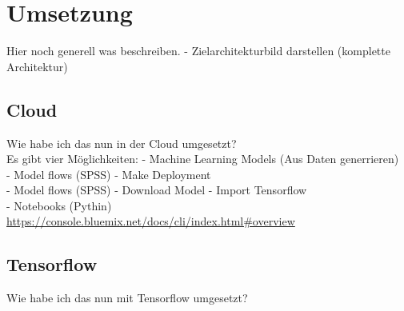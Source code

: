 \section{Umsetzung}
Hier noch generell was beschreiben. - Zielarchitekturbild darstellen (komplette Architektur)

\subsection{Cloud}
Wie habe ich das nun in der Cloud umgesetzt?\\
Es gibt vier Möglichkeiten:
- Machine Learning Models (Aus Daten generrieren)\\
- Model flows (SPSS) - Make Deployment\\
- Model flows (SPSS) - Download Model - Import Tensorflow\\
- Notebooks (Pythin)\\

\url{https://console.bluemix.net/docs/cli/index.html#overview}

\subsection{Tensorflow}
Wie habe ich das nun mit Tensorflow umgesetzt?